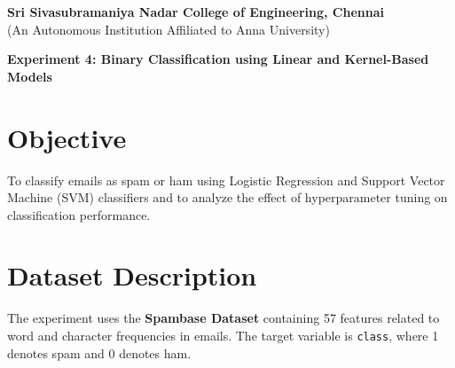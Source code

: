 \documentclass[11pt]{article}
\begin{document}
\begin{center}
    \large \textbf{Sri Sivasubramaniya Nadar College of Engineering, Chennai} \\
    (An Autonomous Institution Affiliated to Anna University) \\
    \vspace{0.3cm}
\end{center}

\begin{table}[!h]
\renewcommand{\arraystretch}{1.5}
\end{table}

\begin{center}
\textbf{Experiment 4: Binary Classification using Linear and Kernel-Based Models}
\end{center}

\section{Objective}
To classify emails as spam or ham using Logistic Regression and Support Vector Machine (SVM) classifiers and to analyze the effect of hyperparameter tuning on classification performance.

\section{Dataset Description}
The experiment uses the \textbf{Spambase Dataset} containing 57 features related to word and character frequencies in emails. The target variable is \texttt{class}, where 1 denotes spam and 0 denotes ham.

\end{document}
